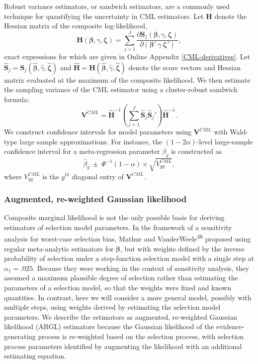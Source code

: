 \documentclass[
  american,
  man, donotrepeattitle,floatsintext]{apa7}
\begin{document}
Robust variance estimators, or sandwich estimators, are a commonly used technique for quantifying the uncertainty in CML estimators. Let \(\mathbf{H}\) denote the Hessian matrix of the composite log-likelihood,
\begin{equation}
\mathbf{H}(\boldsymbol\beta, \gamma, \boldsymbol\zeta) = \sum_{j=1}^J \frac{\partial \mathbf{S}_j(\boldsymbol\beta, \gamma, \boldsymbol\zeta)}{\partial \left(\boldsymbol\beta' \ \gamma \ \boldsymbol\zeta'\right)},
\end{equation}
exact expressions for which are given in Online Appendix \ref{CML-derivatives}.
Let \(\mathbf{\hat{S}}_j = \mathbf{S}_j(\boldsymbol{\hat\beta}, \hat\gamma, \boldsymbol{\hat\zeta})\) and \(\mathbf{\hat{H}} = \mathbf{H}(\boldsymbol{\hat\beta}, \hat\gamma, \boldsymbol{\hat\zeta})\) denote the score vectors and Hessian matrix evaluated at the maximum of the composite likelihood.
We then estimate the sampling variance of the CML estimator using a cluster-robust sandwich formula:
\begin{equation}
\label{eq:sandwich-variance}
\mathbf{V}^{CML} = \mathbf{\hat{H}}^{-1}\left(\sum_{j=1}^J \mathbf{\hat{S}}_j {\mathbf{\hat{S}}_j}'\right) \mathbf{\hat{H}}^{-1}.
\end{equation}
We construct confidence intervals for model parameters using \(\mathbf{V}^{CML}\) with Wald-type large sample approximations. For instance, the \((1 - 2\alpha)\)-level large-sample confidence interval for a meta-regression parameter \(\beta_g\) is constructed as
\[
\hat\beta_g \ \pm \ \Phi^{-1}(1 - \alpha) \times \sqrt{V^{CML}_{gg}},
\]
where \(V^{CML}_{gg}\) is the \(g^{th}\) diagonal entry of \(\mathbf{V}^{CML}\).

\subsubsection{Augmented, re-weighted Gaussian likelihood}\label{augmented-re-weighted-gaussian-likelihood}

Composite marginal likelihood is not the only possible basis for deriving estimators of selection model parameters.
In the framework of a sensitivity analysis for worst-case selection bias, Mathur and VanderWeele\textsuperscript{46} proposed using regular meta-analytic estimators for \(\boldsymbol\beta\), but with weights defined by the inverse probability of selection under a step-function selection model with a single step at \(\alpha_1 = .025\).
Because they were working in the context of sensitivity analysis, they assumed a maximum plausible degree of selection rather than estimating the parameters of a selection model, so that the weights were fixed and known quantities.
In contrast, here we will consider a more general model, possibly with multiple steps, using weights derived by estimating the selection model parameters.
We describe the estimators as augmented, re-weighted Gaussian likelihood (ARGL) estimators because the Gaussian likelihood of the evidence-generating process is re-weighted based on the selection process, with selection process parameters identified by augmenting the likelihood with an additional estimating equation.
\end{document}
